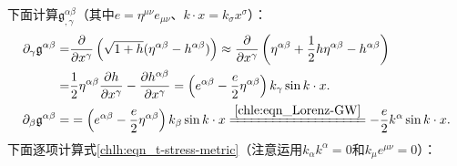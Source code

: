 下面计算$\mathfrak{g}^{\alpha \beta}_{,\gamma}$（其中$e=\eta^{\mu\nu}e_{\mu\nu}$、$k\cdot x=k_\sigma x^\sigma$）：
\begin{align}
	\partial_\gamma \mathfrak{g}^{\alpha \beta}=&
	\frac{\partial }{\partial x^\gamma} \left(\sqrt{1+h}(\eta^{\alpha\beta}-h^{\alpha\beta})\right)
	\approx \frac{\partial }{\partial x^\gamma} \left(\eta^{\alpha\beta}+\frac{1}{2}h\eta^{\alpha\beta}	
	-h^{\alpha\beta}\right) \notag \\
	=& \frac{1}{2}\eta^{\alpha\beta} \frac{\partial h}{\partial x^\gamma} 
	-\frac{\partial h^{\alpha\beta}}{\partial x^\gamma} 
	=\left(e^{\alpha\beta}-\frac{e}{2}\eta^{\alpha\beta}\right) k_\gamma \sin k\cdot x  .
	\label{chle:eqn_pg1} \\
	\partial_\beta \mathfrak{g}^{\alpha \beta}=&
	=\left(e^{\alpha\beta}-\frac{e}{2}\eta^{\alpha\beta}\right) k_\beta \sin k\cdot x  
	\xlongequal{\ref{chle:eqn_Lorenz-GW}} -\frac{e}{2} k^{\alpha} \sin k\cdot x . 
	\label{chle:eqn_pg1-tr} 
\end{align}
下面逐项计算式\eqref{chlh:eqn_t-stress-metric}（注意运用$k_\alpha  k^{\alpha}=0$和$k_\mu e^{\mu\nu}=0$）：
